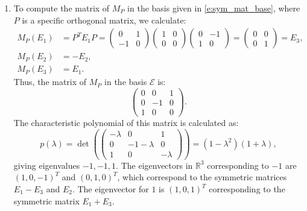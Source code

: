 \documentclass{report}
\begin{document}
\begin{enumerate}[label=(\alph*)]
\item To compute the matrix of \(M_P\) in the basis given in \eqref{e:sym_mat_base}, where \(P\) is a specific orthogonal matrix, we calculate:
\begin{align*}
M_P(E_1) &= P^T E_1 P = \begin{pmatrix} 0 & 1 \\ -1 & 0 \end{pmatrix} \begin{pmatrix} 1 & 0 \\ 0 & 0 \end{pmatrix} \begin{pmatrix} 0 & -1 \\ 1 & 0 \end{pmatrix} = \begin{pmatrix} 0 & 0 \\ 0 & 1 \end{pmatrix} = E_3, \\
M_P(E_2) &= -E_2, \\
M_P(E_3) &= E_1.
\end{align*}
Thus, the matrix of \(M_P\) in the basis \(\mathcal{E}\) is:
\[
\begin{pmatrix} 0 & 0 & 1 \\ 0 & -1 & 0 \\ 1 & 0 & 0 \end{pmatrix}.
\]
The characteristic polynomial of this matrix is calculated as:
\[
p(\lambda) = \det \left( \begin{pmatrix} -\lambda & 0 & 1 \\ 0 & -1-\lambda & 0 \\ 1 & 0 & -\lambda \end{pmatrix} \right) = (1 - \lambda^2)(1 + \lambda),
\]
giving eigenvalues \(-1, -1, 1\). The eigenvectors in \(\mathbb{R}^3\) corresponding to \(-1\) are \((1, 0, -1)^T\) and \((0, 1, 0)^T\), which correspond to the symmetric matrices \(E_1 - E_3\) and \(E_2\). The eigenvector for \(1\) is \((1, 0, 1)^T\) corresponding to the symmetric matrix \(E_1 + E_3\).
\end{enumerate}
\end{document}
